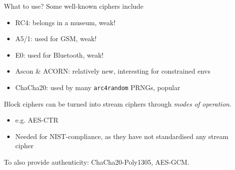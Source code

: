 \begin{frame}{What to use?}
  Some well-known ciphers include
  \pause
  \begin{itemize}[<+->]
    \item[\ding{55}] RC4: belongs in a museum, weak!
    \item[\ding{55}] A5/1: used for GSM, weak!
    \item[\ding{55}] E0: used for Bluetooth, weak!
    \item[\ding{51}] Ascon \& ACORN: relatively new, interesting for constrained envs
    \item[\ding{51}] ChaCha20: used by many \texttt{arc4random} PRNGs, popular
  \end{itemize}

  \vspace*{0.5em}

  \pause
  Block ciphers can be turned into stream ciphers through \emph{modes of operation}.
  \begin{itemize}[<+(1)->]
    \item e.g. AES-CTR
    \item Needed for NIST-compliance, as they have not standardised any stream cipher
  \end{itemize}

  \vspace*{0.5em}

  \pause
  To also provide authenticity: ChaCha20-Poly1305, AES-GCM.
\end{frame}


